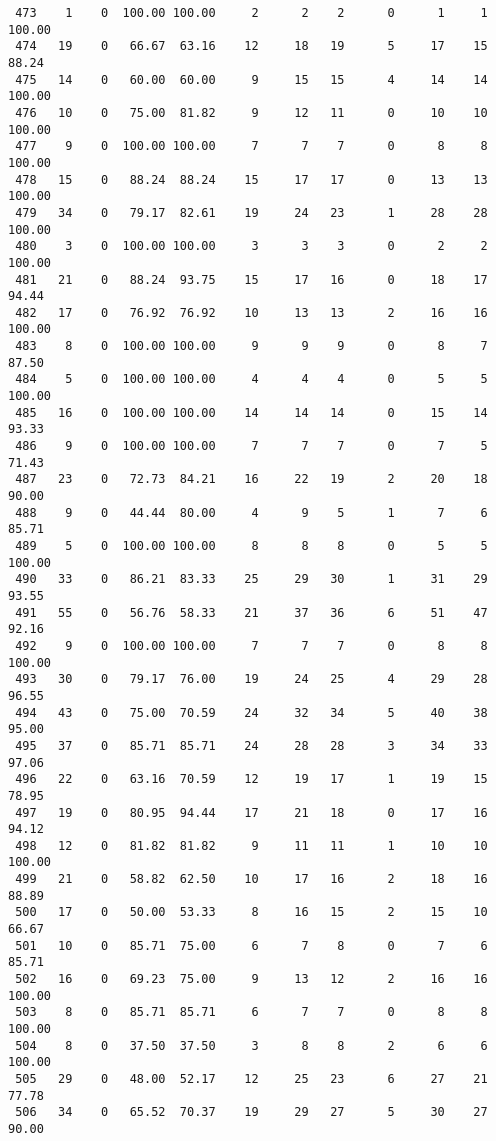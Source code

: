 \begin{verbatim}
 473    1    0  100.00 100.00     2      2    2      0      1     1   100.00
 474   19    0   66.67  63.16    12     18   19      5     17    15    88.24
 475   14    0   60.00  60.00     9     15   15      4     14    14   100.00
 476   10    0   75.00  81.82     9     12   11      0     10    10   100.00
 477    9    0  100.00 100.00     7      7    7      0      8     8   100.00
 478   15    0   88.24  88.24    15     17   17      0     13    13   100.00
 479   34    0   79.17  82.61    19     24   23      1     28    28   100.00
 480    3    0  100.00 100.00     3      3    3      0      2     2   100.00
 481   21    0   88.24  93.75    15     17   16      0     18    17    94.44
 482   17    0   76.92  76.92    10     13   13      2     16    16   100.00
 483    8    0  100.00 100.00     9      9    9      0      8     7    87.50
 484    5    0  100.00 100.00     4      4    4      0      5     5   100.00
 485   16    0  100.00 100.00    14     14   14      0     15    14    93.33
 486    9    0  100.00 100.00     7      7    7      0      7     5    71.43
 487   23    0   72.73  84.21    16     22   19      2     20    18    90.00
 488    9    0   44.44  80.00     4      9    5      1      7     6    85.71
 489    5    0  100.00 100.00     8      8    8      0      5     5   100.00
 490   33    0   86.21  83.33    25     29   30      1     31    29    93.55
 491   55    0   56.76  58.33    21     37   36      6     51    47    92.16
 492    9    0  100.00 100.00     7      7    7      0      8     8   100.00
 493   30    0   79.17  76.00    19     24   25      4     29    28    96.55
 494   43    0   75.00  70.59    24     32   34      5     40    38    95.00
 495   37    0   85.71  85.71    24     28   28      3     34    33    97.06
 496   22    0   63.16  70.59    12     19   17      1     19    15    78.95
 497   19    0   80.95  94.44    17     21   18      0     17    16    94.12
 498   12    0   81.82  81.82     9     11   11      1     10    10   100.00
 499   21    0   58.82  62.50    10     17   16      2     18    16    88.89
 500   17    0   50.00  53.33     8     16   15      2     15    10    66.67
 501   10    0   85.71  75.00     6      7    8      0      7     6    85.71
 502   16    0   69.23  75.00     9     13   12      2     16    16   100.00
 503    8    0   85.71  85.71     6      7    7      0      8     8   100.00
 504    8    0   37.50  37.50     3      8    8      2      6     6   100.00
 505   29    0   48.00  52.17    12     25   23      6     27    21    77.78
 506   34    0   65.52  70.37    19     29   27      5     30    27    90.00

\end{verbatim}
